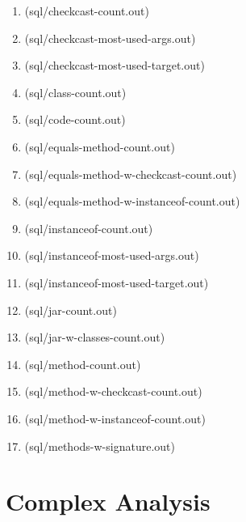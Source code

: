 \begin{enumerate}
\item{}(sql/checkcast-count.out)
\label{sec:org73434e9}
\item{}(sql/checkcast-most-used-args.out)
\label{sec:org11f79e5}
\item{}(sql/checkcast-most-used-target.out)
\label{sec:org8af056a}
\item{}(sql/class-count.out)
\label{sec:org296e0e1}
\item{}(sql/code-count.out)
\label{sec:org42a88b4}
\item{}(sql/equals-method-count.out)
\label{sec:org863b025}
\item{}(sql/equals-method-w-checkcast-count.out)
\label{sec:org5d64cc5}
\item{}(sql/equals-method-w-instanceof-count.out)
\label{sec:org1f42d6e}
\item{}(sql/instanceof-count.out)
\label{sec:orgf789f5d}
\item{}(sql/instanceof-most-used-args.out)
\label{sec:orga81841d}
\item{}(sql/instanceof-most-used-target.out)
\label{sec:org545e09b}
\item{}(sql/jar-count.out)
\label{sec:org7bdee61}
\item{}(sql/jar-w-classes-count.out)
\label{sec:orga0de959}
\item{}(sql/method-count.out)
\label{sec:org5b58bd8}
\item{}(sql/method-w-checkcast-count.out)
\label{sec:org7d1f17e}
\item{}(sql/method-w-instanceof-count.out)
\label{sec:org06bc895}
\item{}(sql/methods-w-signature.out)
\label{sec:org64899a1}
\end{enumerate}

\section{Complex Analysis}
\label{sec:org799c82c}

